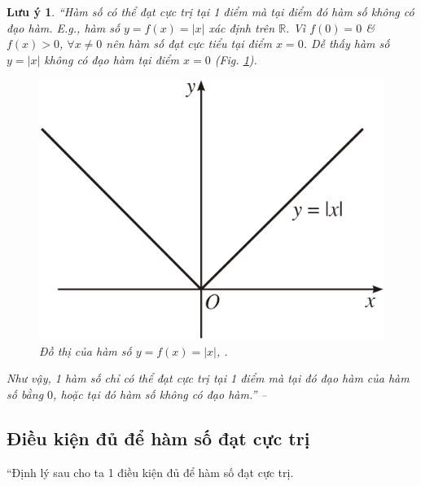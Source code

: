 \documentclass[oneside]{book}
\numberwithin{equation}{section}
\newtheorem{luuy}{Lưu ý}[section]
\begin{document}
\begin{luuy}
	``Hàm số có thể đạt cực trị tại 1 điểm mà tại điểm đó hàm số không có đạo hàm. E.g., hàm số $y = f(x) = |x|$ xác định trên $\mathbb{R}$. Vì $f(0) = 0$ \& $f(x) > 0$, $\forall x\ne 0$ nên hàm số đạt cực tiểu tại điểm $x = 0$. Dễ thấy hàm số $y = |x|$ không có đạo hàm tại điểm $x = 0$ (Fig. \ref{fig:graph_abs}).
	
	\begin{figure}[H]
		\centering
		\includegraphics[scale=0.15]{graph_abs}
		\caption{Đồ thị của hàm số $y = f(x) = |x|$, \cite[Hình 1.3, p. 12]{SGK_Toan_12_giai_tich_nang_cao}.}
		\label{fig:graph_abs}
	\end{figure}
	Như vậy, 1 hàm số chỉ có thể đạt cực trị tại 1 điểm mà tại đó đạo hàm của hàm số bằng $0$, hoặc tại đó hàm số không có đạo hàm.'' -- \cite[p. 11]{SGK_Toan_12_giai_tich_nang_cao}
\end{luuy}

\subsection{Điều kiện đủ để hàm số đạt cực trị}
``Định lý sau cho ta 1 điều kiện đủ để hàm số đạt cực trị.
\end{document}
